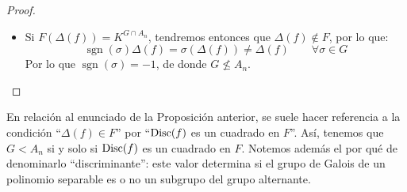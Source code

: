 \begin{prop}
\begin{proof}
\begin{itemize}
\begin{equation*}
                    K^{G\cap A_n} =K^G = F = F(\Delta(f))
                \end{equation*}
            \item Si $F(\Delta(f)) = K^{G\cap A_n}$, tendremos entonces que $\Delta(f)\notin F$, por lo que:
                \begin{equation*}
                    \operatorname{sgn}(\sigma)\Delta(f) = \sigma(\Delta(f)) \neq \Delta(f)  \qquad \forall \sigma\in G
                \end{equation*}
                Por lo que $\operatorname{sgn}(\sigma) = -1$, de donde $G\not\leq A_n$.
        \end{itemize}
    \end{proof}
\end{prop}

\noindent
En relación al enunciado de la Proposición anterior, se suele hacer referencia a la condición ``$\Delta(f)\in F$''  por ``$\operatorname{Disc}(f)$ es un cuadrado en $F$''. Así, tenemos que $G<A_n$ si y solo si $\operatorname{Disc}(f)$ es un cuadrado en $F$. Notemos además el por qué de denominarlo ``discriminante'': este valor determina si el grupo de Galois de un polinomio separable es o no un subgrupo del grupo alternante.

